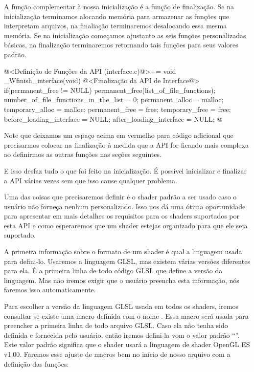 
A função complementar à nossa inicialização é a função de
finalização. Se na inicialização terminamos alocando memória para
armazenar as funções que interpretam arquivos, na finaliação
terminaremos desalocando essa mesma memória. Se na inicialização
começamos ajustanto as seis funções personalizadas básicas, na
finalização terminaremos retornando tais funções para seus valores
padrão.

\iniciocodigo
@<Definição de Funções da API (interface.c)@>+=
void _Wfinish_interface(void){
  @<Finalização da API de Interface@>
  if(permanent_free != NULL)
    permanent_free(list_of_file_functions);
  number_of_file_functions_in_the_list = 0;
  permanent_alloc = malloc;
  temporary_alloc = malloc;
  permanent_free = free;
  temporary_free = free;
  before_loading_interface = NULL;
  after_loading_interface = NULL;
}
@
\fimcodigo

Note que deixamos um espaço acima em vermelho para código adicional
que precisarmos colocar na finalização à medida que a API for ficando
mais complexa ao definirmos as outras funções nas seções seguintes.

E isso desfaz tudo o que foi feito na inicialização. É possível
inicializar e finalizar a API várias vezes sem que isso cause qualquer
problema.


Uma das coisas que precisaremos definir é o shader padrão a ser usado
caso o usuário não forneça nenhum personalizado. Isso nos dá uma ótima
oportunidade para apresentar em mais detalhes os requisitos para os
shaders suportados por esta API e como esperaremos que um shader
estejas organizado para que ele seja suportado.

A primeira informação sobre o formato de um shader é qual a linguagem
usada para defini-lo. Usaremos a linguagem GLSL, mas existem várias
versões diferentes para ela. É a primeira linha de todo código GLSL
que define a versão da linguagem. Mas não iremos exigir que o usuário
preencha esta informação, nós faremos isso automaticamente.

Para escolher a versão da linguagem GLSL usada em todos os shaders,
iremos consultar se existe uma macro definida com o nome
. Essa macro será usada para preencher a
primeira linha de todo arquivo GLSL. Caso ela não tenha sido definida
e fornecida pelo usuário, então iremos defini-la vom o valor padrão
``''. Este valor padrão significa que o
shader usará a linguagem de shader OpenGL ES v1.00. Faremos esse
ajuste de macros bem no início de nosso arquivo com a definição das
funções:

